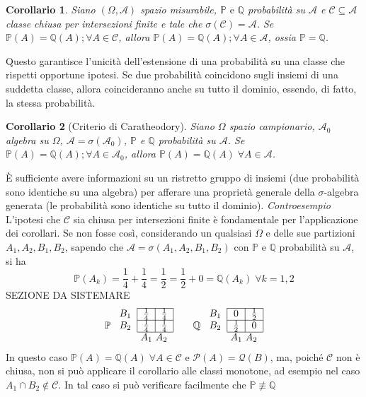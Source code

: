 \documentclass[a4paper,12pt]{article}
\theoremstyle{break}
\newtheorem{corollary}{Corollario}[section]
\numberwithin{equation}{section}
\begin{document}
\begin{corollary}
  Siano \((\Omega, \mathcal{A})\) spazio misurabile, \(\mathbb{P} \mbox{ e } \mathbb{Q}\) probabilità su \(\mathcal{A}\) e \(\mathcal{C} \subseteq \mathcal{A}\) classe chiusa per intersezioni finite e tale che \(\sigma(\mathcal{C}) = \mathcal{A}\). Se \(\mathbb{P}(A) = \mathbb{Q}(A) ; \forall A \in \mathcal{C}\), allora \(\mathbb{P}(A) = \mathbb{Q}(A) ; \forall A \in \mathcal{A}\), ossia \(\mathbb{P} = \mathbb{Q}\).
\end{corollary}
Questo garantisce l'unicità dell'estensione di una probabilità su una classe che rispetti opportune ipotesi. Se due probabilità coincidono sugli insiemi di una suddetta classe, allora coincideranno anche su tutto il dominio, essendo, di fatto, la stessa probabilità.
\begin{corollary}[Criterio di Caratheodory]
  Siano \(\Omega\) spazio campionario, \(\mathcal{A}_0\) algebra su \(\Omega\), \(\mathcal{A} = \sigma(\mathcal{A_0})\), \(\mathbb{P}\) e \(\mathbb{Q}\) probabilità su \(\mathcal{A}\). Se \(\mathbb{P}(A) = \mathbb{Q}(A) ; \forall A \in \mathcal{A_0}\), allora \(\mathbb{P}(A) = \mathbb{Q}(A) \; \forall A \in \mathcal{A}\).
\end{corollary}
È sufficiente avere informazioni su un ristretto gruppo di insiemi (due probabilità sono identiche su una algebra) per afferare una proprietà generale della \(\sigma\)-algebra generata (le probabilità sono identiche su tutto il dominio).
\textit{Controesempio}
L'ipotesi che \(\mathcal{C}\) sia chiusa per intersezioni finite è fondamentale per l'applicazione dei corollari. Se non fosse così, considerando un qualsiasi \(\Omega\) e delle sue partizioni \(A_1, A_2, B_1, B_2\), sapendo che \(\mathcal{A} = \sigma(A_1, A_2, B_1, B_2)\) con \(\mathbb{P}\) e \(\mathbb{Q}\) probabilità su \(\mathcal{A}\), si ha 
\[
  \mathbb{P}(A_k) = \frac{1}{4} + \frac{1}{4} = \frac{1}{2} = \frac{1}{2} + 0 = \mathbb{Q}(A_k) \; \forall k = 1,2
\]
SEZIONE DA SISTEMARE
\[
  \mathbb{P} \;
  \begin{tabular}{c|c|c|}
  
    \cline{2-3}
    \(B_1\) & \(\frac{1}{4}\) & \(\frac{1}{4}\) \\
    \cline{2-3}
     \(B_2\) & \(\frac{1}{4}\) & \(\frac{1}{4}\) \\
    \cline{2-3}
     \multicolumn{3}{r}{$A_1$ $A_2$}
  \end{tabular}
  \qquad
  \mathbb{Q} \;
  \begin{tabular}{c|c|c|}
  
    \cline{2-3}
    \(B_1\) & 0 & \(\frac{1}{2}\) \\
    \cline{2-3}
     \(B_2\) & \(\frac{1}{2}\) & 0 \\
    \cline{2-3}
     \multicolumn{3}{r}{$A_1$ $A_2$}
  \end{tabular}
\]
In questo caso \(\mathbb{P}(A) = \mathbb{Q}(A) \; \forall A \in \mathcal{C}\) e \(\mathcal{P}(A) = \mathcal{Q}(B)\), ma, poiché \(\mathcal{C}\) non è chiusa, non si può applicare il corollario alle classi monotone, ad esempio nel caso \(A_1 \cap B_2 \not \in \mathcal{C}\). In tal caso si può verificare facilmente che \(\mathbb{P} \not \equiv \mathbb{Q}\)
\end{document}

